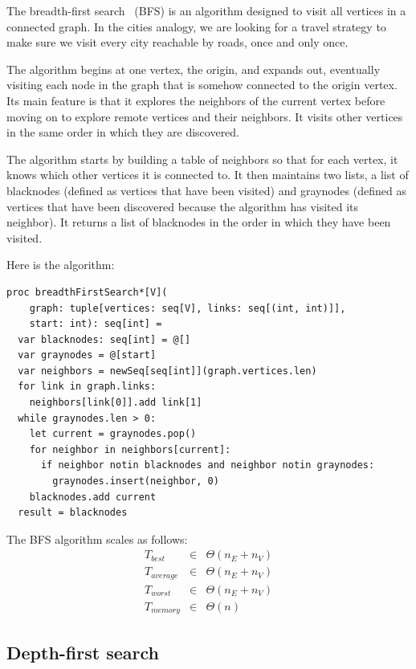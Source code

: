 \documentclass[justified, sixbynine]{tufte-book}
\def\ft{\small\tt}
\theoremstyle{plain}%
\newtheorem * {corollary}{Corollary}
\theoremstyle{definition}
\theoremstyle{remark}
\newtheorem * {remark}{Remark}
\newtheorem * {note}{Note}
\begin{document}
\begin{fullwidth}

The breadth-first search~\cite{bfs} (BFS) is an algorithm designed to visit all vertices in a connected graph. In the cities analogy, we are looking for a travel strategy to make sure we visit every city reachable by roads, once and only once.

The algorithm begins at one vertex, the origin, and expands out, eventually visiting each node in the graph that is somehow connected to the origin vertex. Its main feature is that it explores the neighbors of the current vertex before moving on to explore remote vertices and their neighbors. It visits other vertices in the same order in which they are discovered.

The algorithm starts by building a table of neighbors so that for each vertex, it knows which other vertices it is connected to. It then maintains two lists, a list of blacknodes (defined as vertices that have been visited) and graynodes (defined as vertices that have been discovered because the algorithm has visited its neighbor). It returns a list of blacknodes in the order in which they have been visited.

Here is the algorithm:

\begin{lstlisting}[caption={in file: {\ft nlib/graph.nim}}]
proc breadthFirstSearch*[V](
    graph: tuple[vertices: seq[V], links: seq[(int, int)]],
    start: int): seq[int] =
  var blacknodes: seq[int] = @[]
  var graynodes = @[start]
  var neighbors = newSeq[seq[int]](graph.vertices.len)
  for link in graph.links:
    neighbors[link[0]].add link[1]
  while graynodes.len > 0:
    let current = graynodes.pop()
    for neighbor in neighbors[current]:
      if neighbor notin blacknodes and neighbor notin graynodes:
        graynodes.insert(neighbor, 0)
    blacknodes.add current
  result = blacknodes
\end{lstlisting}

The BFS algorithm scales as follows:
\begin{eqnarray}
T_{best} &\in &\Theta (n_E+n_V) \\
T_{average} &\in &\Theta (n_E+n_V) \\
T_{worst} &\in &\Theta (n_E+n_V) \\
T_{memory} &\in &\Theta (n)
\end{eqnarray}

\subsection{Depth-first search}


\end{fullwidth}
\end{document}
